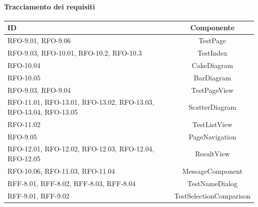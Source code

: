 \paragraph{Tracciamento dei requisiti}
\begin{tabularx}{\textwidth}{|X|c|}
    \hline
    \textbf{ID} & \textbf{Componente} \\
    \hline
        RFO-9.01, RFO-9.06 & TestPage \\
    \hline
        RFO-9.03, RFO-10.01, RFO-10.2, RFO-10.3 & TestIndex \\
    \hline
        RFO-10.04 & CakeDiagram \\
    \hline
        RFO-10.05 & BarDiagram \\
    \hline
        RFO-9.03, RFO-9.04  & TestPageView \\
    \hline
        RFO-11.01, RFO-13.01, RFO-13.02, RFO-13.03, RFO-13.04, RFO-13.05  & ScatterDiagram \\
    \hline
        RFO-11.02 & TestListView \\
    \hline
        RFO-9.05 & PageNavigation \\
    \hline
        RFO-12.01, RFO-12.02, RFO-12.03, RFO-12.04, RFO-12.05 & ResultView\\
    \hline
        RFO-10.06, RFO-11.03, RFO-11.04 & MessageComponent \\
    \hline
        RFF-8.01, RFF-8.02, RFF-8.03, RFF-8.04 & TestNameDialog \\
    \hline
        RFF-9.01, RFF-9.02 & TestSelectionComparison\\
    \hline
\end{tabularx}